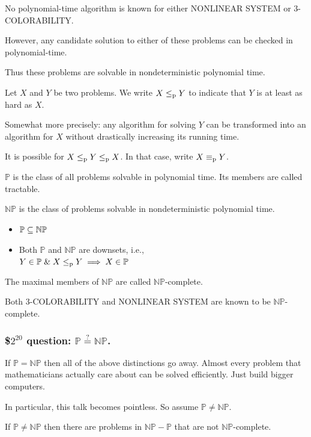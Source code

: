 \documentclass[12pt,xcolor=dvipsnames,handout
   ]{beamer}
\newcommand{\bigpause}{\pause\bigskip}
\renewcommand{\.}{\cdot}
\newcommand{\reduc}{\leq_{\text{\textnormal{p}}}}
\newcommand{\equivp}{\equiv_{\text{\textnormal{p}}}}
\newcommand{\NP}{\ensuremath{\mathbb{NP}}\xspace}
\renewcommand{\P}{\ensuremath{\mathbb{P}}\xspace}
\let\emph=\alert
\begin{document}
\begin{frame}
  No polynomial-time algorithm is known for either NONLINEAR SYSTEM or
  3-COLORABILITY. 

  \bigpause
  However, any candidate solution to either of these problems can be
  checked in polynomial-time. 

  \bigpause
  Thus these problems are solvable in \emph{nondeterministic polynomial
    time.} 
\end{frame}

\begin{frame}
  Let $X$ and $Y$ be two problems. We write $X \reduc Y$ to indicate that
  $Y$ is at least as hard as $X$.

  \bigpause
  Somewhat more precisely: any algorithm for solving $Y$ can be
  transformed into an algorithm for $X$ without drastically increasing
  its running time.

  \bigpause
  It is possible for $X\reduc Y \reduc X$. In that case, write $X\equivp
  Y$. 

\end{frame}

\begin{frame}
  \P is the class of all problems solvable in polynomial time. Its
  members are called \emph{tractable.}

  \NP is the class of problems solvable in nondeterministic polynomial
  time. 

  \pause
  \begin{itemize}
  \item $\P \sseq \NP$
  \item Both $\P$ and $\NP$ are downsets, i.e., \\
    $Y\in \P \mathrel{\&} X\reduc Y \implies X\in \P$
  \end{itemize}

  \pause
  The maximal members of \NP are called \emph{\NP-complete.} 

  
  Both 3-COLORABILITY and NONLINEAR SYSTEM are known to be
  \NP-complete. 
\end{frame}

\begin{frame}
  \frametitle{\$$2^{20}$ question: $\P \overset{?}{=} \NP$.}

  \pause
  If $\P=\NP$ then all of the above distinctions go away. Almost every
  problem that mathematicians actually care about can be solved
  efficiently. Just build bigger computers.

  \pause
  In particular, this talk becomes pointless. So assume $\P\neq \NP$.

  \pause
  \begin{theorem}
    If $\P \neq \NP$ then there are problems in $\NP-
    \P$ that are not \NP-complete.
  \end{theorem}

\end{frame}
\end{document}
